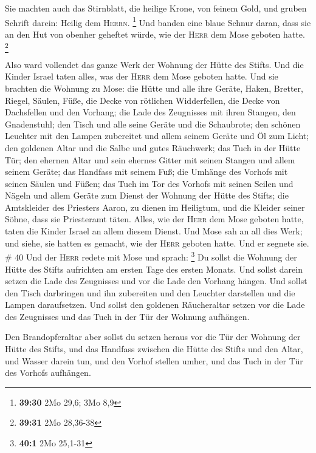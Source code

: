  Sie machten auch das Stirnblatt, die heilige Krone, von
feinem Gold, und gruben Schrift darein: Heilig dem \textsc{Herrn}.
\footnote{\textbf{39:30} 2Mo 29,6; 3Mo 8,9}  Und banden
eine blaue Schnur daran, dass sie an den Hut von obenher geheftet würde,
wie der \textsc{Herr} dem Mose geboten hatte. \footnote{\textbf{39:31}
  2Mo 28,36-38}

 Also ward vollendet das ganze Werk der Wohnung der Hütte
des Stifts. Und die Kinder Israel taten alles, was der \textsc{Herr} dem
Mose geboten hatte.  Und sie brachten die Wohnung zu
Mose: die Hütte und alle ihre Geräte, Haken, Bretter, Riegel, Säulen,
Füße,  die Decke von rötlichen Widderfellen, die Decke
von Dachsfellen und den Vorhang;  die Lade des Zeugnisses
mit ihren Stangen, den Gnadenstuhl;  den Tisch und alle
seine Geräte und die Schaubrote;  den schönen Leuchter
mit den Lampen zubereitet und allem seinem Geräte und Öl zum Licht;
 den goldenen Altar und die Salbe und gutes Räuchwerk;
das Tuch in der Hütte Tür;  den ehernen Altar und sein
ehernes Gitter mit seinen Stangen und allem seinem Geräte; das Handfass
mit seinem Fuß;  die Umhänge des Vorhofs mit seinen
Säulen und Füßen; das Tuch im Tor des Vorhofs mit seinen Seilen und
Nägeln und allem Geräte zum Dienst der Wohnung der Hütte des Stifts;
 die Amtskleider des Priesters Aaron, zu dienen im
Heiligtum, und die Kleider seiner Söhne, dass sie Priesteramt täten.
 Alles, wie der \textsc{Herr} dem Mose geboten hatte,
taten die Kinder Israel an allem diesem Dienst.  Und Mose
sah an all dies Werk; und siehe, sie hatten es gemacht, wie der
\textsc{Herr} geboten hatte. Und er segnete sie. \# 40 
Und der \textsc{Herr} redete mit Mose und sprach: \footnote{\textbf{40:1}
  2Mo 25,1-31}  Du sollst die Wohnung der Hütte des Stifts
aufrichten am ersten Tage des ersten Monats.  Und sollst
darein setzen die Lade des Zeugnisses und vor die Lade den Vorhang
hängen.  Und sollst den Tisch darbringen und ihn
zubereiten und den Leuchter darstellen und die Lampen daraufsetzen.
 Und sollst den goldenen Räucheraltar setzen vor die Lade
des Zeugnisses und das Tuch in der Tür der Wohnung aufhängen.

 Den Brandopferaltar aber sollst du setzen heraus vor die
Tür der Wohnung der Hütte des Stifts,  und das Handfass
zwischen die Hütte des Stifts und den Altar, und Wasser darein tun,
 und den Vorhof stellen umher, und das Tuch in der Tür des
Vorhofs aufhängen.


